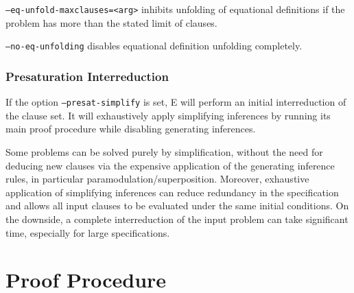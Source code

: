 \documentclass{report}
\begin{document}
\texttt{--eq-unfold-maxclauses=<arg>} inhibits unfolding of
equational definitions if the problem has more than the stated limit
of clauses.

\texttt{--no-eq-unfolding} disables equational definition unfolding
completely.



\subsubsection{Presaturation Interreduction}
\label{sec:presat}

If the option \texttt{--presat-simplify} is set, E will perform an
initial interreduction of the clause set. It will
exhaustively apply simplifying inferences by running its main proof
procedure while disabling generating inferences.

Some problems can be solved purely by simplification, without the need
for deducing new clauses via the expensive application of the
generating inference rules, in particular
paramodulation/superposition. Moreover, exhaustive application of
simplifying inferences can reduce redundancy in the specification and
allows all input clauses to be evaluated under the same initial
conditions. On the downside, a complete interreduction of the input
problem can take significant time, especially for large
specifications.



\section{Proof Procedure}
\label{sec:procedure}
\end{document}
